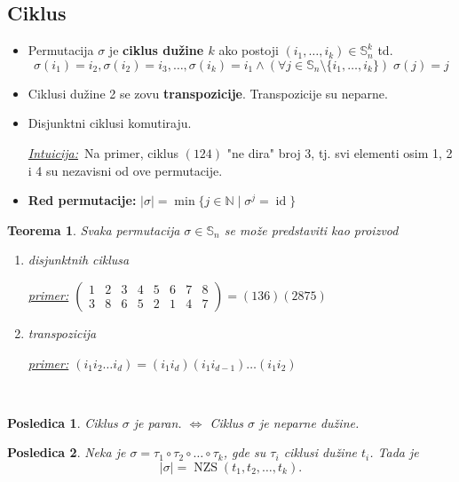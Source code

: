 \documentclass[a4paper,12pt,twoside]{report}
\newtheorem{theorem}{Teorema}[section]
\newtheorem{corollary}{Posledica}[theorem]
\numberwithin{algorithm}{section}
\newcommand{\intuicija}{\noindent\underline{\textit{Intuicija:}}\ }
\begin{document}
\subsection{Ciklus}
\begin{itemize}
    \item Permutacija $\sigma$ je \textbf{ciklus dužine $k$} ako postoji $(i_1, \dots, i_k) \in \mathbb{S}_n^k$ td. \[  \sigma(i_1) = i_2, \sigma(i_2)
    = i_3, \dots, \sigma(i_k) = i_1 \land (\forall j \in \mathbb{S}_n \setminus \{i_1, \dots, i_k\})\;\sigma(j) = j \]
    \item Ciklusi dužine 2 se zovu \textbf{transpozicije}. Transpozicije su neparne.
    \item Disjunktni ciklusi komutiraju. 
    
    \intuicija Na primer, ciklus $(124)$ "ne dira" broj 3, tj. svi elementi osim 1, 2 i 4 su nezavisni od ove permutacije.
    \item \textbf{Red permutacije:} $|\sigma| = \min\{j \in \mathbb{N} \; | \; \sigma^j = \operatorname{id}\}$
\end{itemize}
\newpage
\begin{theorem}
    Svaka permutacija $\sigma \in \mathbb{S}_n$ se može predstaviti kao proizvod
    \begin{enumerate}
        \item disjunktnih ciklusa 
        
        \;\;\underline{primer:} $\begin{pmatrix} 
1 & 2 & 3 & 4 & 5 & 6 & 7 & 8 \\ 
3 & 8 & 6 & 5 & 2 & 1 & 4 & 7 
\end{pmatrix} = (136)(2875)$
        \item transpozicija
    
        \;\;\underline{primer:} $(i_1 i_2 \dots i_d) = (i_1 i_d)(i_1 i_{d-1}) \dots (i_1 i_2)$ 
    \end{enumerate}
\end{theorem}\

\begin{corollary}
    Ciklus $\sigma$ je paran. $\iff$ Ciklus $\sigma$ je neparne dužine.
\end{corollary}

\begin{corollary}
    Neka je $\sigma = \tau_1 \circ \tau_2 \circ \dots \circ \tau_k$, gde su $\tau_i$ ciklusi dužine $t_i$. Tada je\[ 
    |\sigma| = \operatorname{NZS}(t_1, t_2, \dots, t_k).
\]
\end{corollary}
\end{document}
